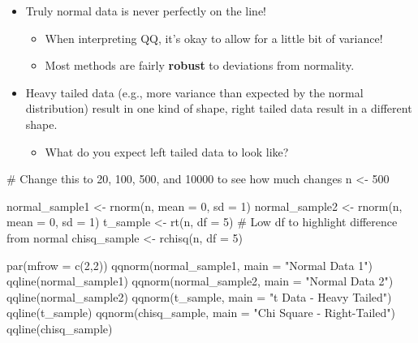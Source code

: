 \documentclass[
  letterpaper,
  DIV=11,
  numbers=noendperiod,
  oneside]{scrreprt}
\newenvironment{Shaded}{\begin{snugshade}}{\end{snugshade}}
\newcommand{\AttributeTok}[1]{\textcolor[rgb]{0.40,0.45,0.13}{#1}}
\newcommand{\CommentTok}[1]{\textcolor[rgb]{0.37,0.37,0.37}{#1}}
\newcommand{\DecValTok}[1]{\textcolor[rgb]{0.68,0.00,0.00}{#1}}
\newcommand{\FunctionTok}[1]{\textcolor[rgb]{0.28,0.35,0.67}{#1}}
\newcommand{\NormalTok}[1]{\textcolor[rgb]{0.00,0.23,0.31}{#1}}
\newcommand{\OtherTok}[1]{\textcolor[rgb]{0.00,0.23,0.31}{#1}}
\newcommand{\StringTok}[1]{\textcolor[rgb]{0.13,0.47,0.30}{#1}}
\providecommand{\tightlist}{%
  \setlength{\itemsep}{0pt}\setlength{\parskip}{0pt}}\usepackage{longtable,booktabs,array}
\begin{document}
\begin{itemize}
\tightlist
\item
  Truly normal data is never perfectly on the line!

  \begin{itemize}
  \tightlist
  \item
    When interpreting QQ, it's okay to allow for a little bit of
    variance!
  \item
    Most methods are fairly \textbf{robust} to deviations from
    normality.
  \end{itemize}
\item
  Heavy tailed data (e.g., more variance than expected by the normal
  distribution) result in one kind of shape, right tailed data result in
  a different shape.

  \begin{itemize}
  \tightlist
  \item
    What do you expect left tailed data to look like?
  \end{itemize}
\end{itemize}

\begin{Shaded}
\begin{Highlighting}[]
\CommentTok{\# Change this to 20, 100, 500, and 10000 to see how much changes}
\NormalTok{n }\OtherTok{\textless{}{-}} \DecValTok{500}

\NormalTok{normal\_sample1 }\OtherTok{\textless{}{-}} \FunctionTok{rnorm}\NormalTok{(n, }\AttributeTok{mean =} \DecValTok{0}\NormalTok{, }\AttributeTok{sd =} \DecValTok{1}\NormalTok{)}
\NormalTok{normal\_sample2 }\OtherTok{\textless{}{-}} \FunctionTok{rnorm}\NormalTok{(n, }\AttributeTok{mean =} \DecValTok{0}\NormalTok{, }\AttributeTok{sd =} \DecValTok{1}\NormalTok{)}
\NormalTok{t\_sample }\OtherTok{\textless{}{-}} \FunctionTok{rt}\NormalTok{(n, }\AttributeTok{df =} \DecValTok{5}\NormalTok{) }\CommentTok{\# Low df to highlight difference from normal}
\NormalTok{chisq\_sample }\OtherTok{\textless{}{-}} \FunctionTok{rchisq}\NormalTok{(n, }\AttributeTok{df =} \DecValTok{5}\NormalTok{)}

\FunctionTok{par}\NormalTok{(}\AttributeTok{mfrow =} \FunctionTok{c}\NormalTok{(}\DecValTok{2}\NormalTok{,}\DecValTok{2}\NormalTok{))}
\FunctionTok{qqnorm}\NormalTok{(normal\_sample1, }\AttributeTok{main =} \StringTok{"Normal Data 1"}\NormalTok{)}
\FunctionTok{qqline}\NormalTok{(normal\_sample1)}
\FunctionTok{qqnorm}\NormalTok{(normal\_sample2, }\AttributeTok{main =} \StringTok{"Normal Data 2"}\NormalTok{)}
\FunctionTok{qqline}\NormalTok{(normal\_sample2)}
\FunctionTok{qqnorm}\NormalTok{(t\_sample, }\AttributeTok{main =} \StringTok{"t Data {-} Heavy Tailed"}\NormalTok{)}
\FunctionTok{qqline}\NormalTok{(t\_sample)}
\FunctionTok{qqnorm}\NormalTok{(chisq\_sample, }\AttributeTok{main =} \StringTok{"Chi Square {-} Right{-}Tailed"}\NormalTok{)}
\FunctionTok{qqline}\NormalTok{(chisq\_sample)}
\end{Highlighting}
\end{Shaded}
\end{document}
